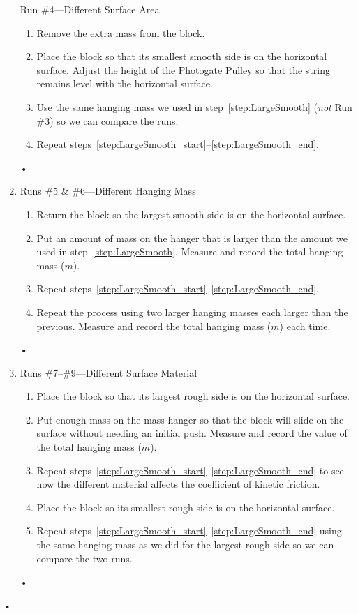 \documentclass[main.tex]{subfiles}
\begin{document}
\begin{enumerate}
Run \#4---Different Surface Area
\begin{enumerate}
\item
Remove the extra mass from the block.
\item
Place the block so that its smallest smooth side is on the horizontal surface. Adjust the height of the Photogate Pulley so that the string remains level with the horizontal surface.
\item
Use the same hanging mass we used in step~\ref{step:LargeSmooth} (\emph{not} Run \#3) so we can compare the runs.
\item
Repeat steps~\ref{step:LargeSmooth_start}--\ref{step:LargeSmooth_end}.
\end{enumerate}•
\item
Runs \#5 \& \#6---Different Hanging Mass
\begin{enumerate}
\item
Return the block so the largest smooth side is on the horizontal surface.
\item
Put an amount of mass on the hanger that is larger than the amount we used in step~\ref{step:LargeSmooth}. Measure and record the total hanging mass ($m$).
\item
Repeat steps~\ref{step:LargeSmooth_start}--\ref{step:LargeSmooth_end}.
\item
Repeat the process using two larger hanging masses each larger than the previous. Measure and record the total hanging mass ($m$) each time.
\end{enumerate}•
\item
Runs \#7--\#9---Different Surface Material 
\begin{enumerate}
\item
Place the block so that its largest rough side is on the horizontal surface.
\item
Put enough mass on the mass hanger so that the block will slide on the surface without needing an initial push. Measure and record the value of the total hanging mass ($m$).
\item
Repeat steps~\ref{step:LargeSmooth_start}--\ref{step:LargeSmooth_end} to see how the different material affects the coefficient of kinetic friction.
\item
Place the block so its smallest rough side is on the horizontal surface.
\item
Repeat steps~\ref{step:LargeSmooth_start}--\ref{step:LargeSmooth_end} using the same hanging mass as we did for the largest rough side so we can compare the two runs.
\end{enumerate}•
\end{enumerate}•
\end{document}

